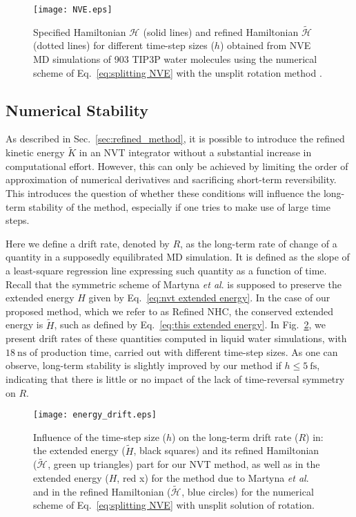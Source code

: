 \documentclass[
	aip,
	jcp,
	reprint,
]{revtex4-1}
\newcommand{\Ham}[1]{{\mathcal H}_\text{#1}}           %
\newcommand{\timestep}{h}
\newcommand{\refined}[1]{\widetilde{#1}}
\begin{document}
\begin{figure}
	\texttt{[image: NVE.eps]}
	\caption{Specified Hamiltonian $\Ham{}$ (solid lines) and refined Hamiltonian $\refined{\Ham{}}$ (dotted lines) for different time-step sizes ($\timestep$) obtained from NVE MD simulations of 903 TIP3P \cite{Jorgensen_1983} water molecules using the numerical scheme of Eq.~\eqref{eq:splitting NVE} with the unsplit rotation method \cite{Silveira_2017}.}
	\label{fig:nve}
\end{figure}

\subsection{Numerical Stability}
\label{sec:numerical stability}

As described in Sec.~\ref{sec:refined_method}, it is possible to introduce the refined kinetic energy $\refined K$ in an NVT integrator without a substantial increase in computational effort.
However, this can only be achieved by limiting the order of approximation of numerical derivatives and sacrificing short-term reversibility.
This introduces the question of whether these conditions will influence the long-term stability of the method, especially if one tries to make use of large time steps.

Here we define a drift rate, denoted by $R$, as the long-term rate of change of a quantity in a supposedly equilibrated MD simulation.
It is defined as the slope of a least-square regression line expressing such quantity as a function of time.
Recall that the symmetric scheme of Martyna \textit{et al}. \cite{Martyna_1996} is supposed to preserve the extended energy $H$ given by Eq.~\eqref{eq:nvt extended energy}.
In the case of our proposed method, which we refer to as Refined NHC, the conserved extended energy is $\refined H$, such as defined by Eq.~\eqref{eq:this extended energy}.
In Fig.~\ref{fig:energy_drift}, we present drift rates of these quantities computed in liquid water simulations, with $18~\text{ns}$ of production time, carried out with different time-step sizes.
As one can observe, long-term stability is slightly improved by our method if $\timestep \le 5~\text{fs}$, indicating that there is little or no impact of the lack of time-reversal symmetry on $R$.

\begin{figure}
	\texttt{[image: energy\_drift.eps]}
	\caption{Influence of the time-step size ($\timestep$) on the long-term drift rate ($R$) in: the extended energy ($\refined{H}$, black squares) and its refined Hamiltonian ($\refined{\Ham{}}$, green up triangles) part for our NVT method, as well as in the extended energy ($H$, red x) for the method due to Martyna \textit{et al}. \cite{Martyna_1996} and in the refined Hamiltonian ($\refined{\Ham{}}$, blue circles) for the numerical scheme of Eq.~\eqref{eq:splitting NVE} with unsplit solution of rotation.}
	\label{fig:energy_drift}
\end{figure}
\end{document}
